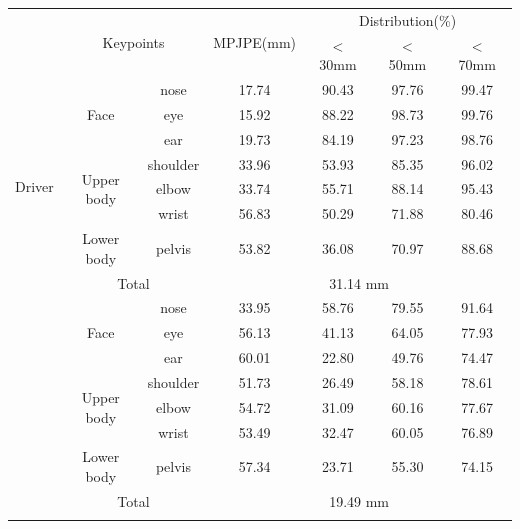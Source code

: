 \documentclass[letterpaper]{article} %
\begin{document}
\begin{table}[t]
\centering
    \begin{tabular}{@{}c | c | c | c | c | c |c @{} }
    \Xhline{3\arrayrulewidth}
             & \multicolumn{2}{c|}{\multirow{2}{*}{Keypoints}} & \multirow{2}{*}{MPJPE(mm)} &  \multicolumn{3}{c}{Distribution(\%)}\\\cline{5-7}
            &           \multicolumn{2}{c|}{}                  & & $<$ 30mm & $<$ 50mm & $<$ 70mm \\\cline{1-7}
    \multirow{8}{*}{Driver} &\multirow{3}{*}{Face} & nose &  17.74 & 90.43 & 97.76 & 99.47 \\\cline{ 3-7}
                            & &eye      &  15.92 & 88.22 & 98.73 & 99.76 \\\cline{3-7}
                            & &ear      & 19.73 & 84.19 & 97.23 & 98.76 \\\cline{ 2-7}
                            &\multirow{3}{*}{Upper body}&shoulder & 33.96 & 53.93 & 85.35 & 96.02 \\\cline{ 3-7}
                            & & elbow      & 33.74 & 55.71 & 88.14 & 95.43 \\\cline{ 3-7}
                            & & wrist      & 56.83 & 50.29 & 71.88 & 80.46 \\\cline{ 2-7}
                            &Lower body& pelvis      & 53.82 & 36.08 & 70.97 & 88.68\\\cline{ 2-7}
                            & \multicolumn{2}{c|}{Total} & \multicolumn{4}{c}{31.14 mm}\\\Xhline{3\arrayrulewidth}

    \multirow{8}{*}{Passenger} &\multirow{3}{*}{Face} & nose & 33.95       & 58.76       & 79.55       & 91.64 \\\cline{ 3-7}
                            & &eye      & 56.13 & 41.13 & 64.05 & 77.93 \\\cline{3-7}
                            & &ear      & 60.01 & 22.80 & 49.76 & 74.47 \\\cline{ 2-7}
                            &\multirow{3}{*}{Upper body}&shoulder & 51.73 & 26.49 & 58.18 & 78.61 \\\cline{ 3-7}
                            & & elbow      & 54.72 & 31.09 & 60.16 & 77.67 \\\cline{ 3-7}
                            & & wrist      & 53.49 & 32.47 & 60.05 & 76.89 \\\cline{ 2-7}
                            &Lower body& pelvis      & 57.34 & 23.71 & 55.30 & 74.15\\\cline{ 2-7}
                            & \multicolumn{2}{c|}{Total} & \multicolumn{4}{c}{19.49 mm}\\\Xhline{3\arrayrulewidth}


\end{tabular}
\end{table}
\end{document}
